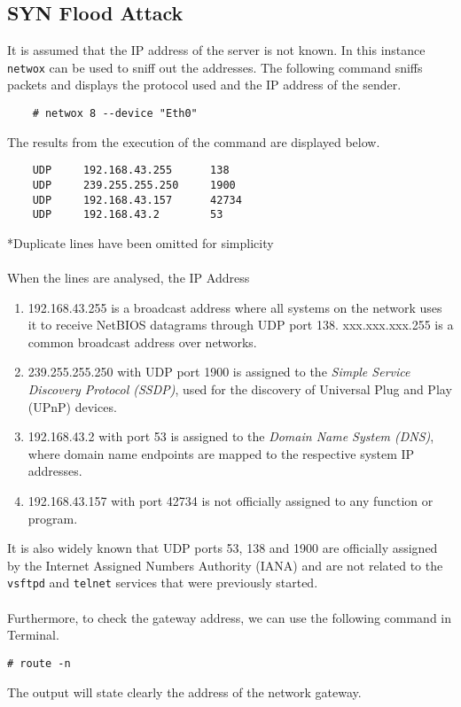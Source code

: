 \documentclass[a4paper,12pt]{article}
\begin{document}
	\subsection{SYN Flood Attack}
	It is assumed that the IP address of the server is not known. In this instance \texttt{netwox} can be used to sniff out the addresses. The following command sniffs packets and displays the protocol used and the IP address of the sender.
	\begin{verbatim}
	# netwox 8 --device "Eth0"
	\end{verbatim}
	\vspace{1em}The results from the execution of the command are displayed below.
	\begin{verbatim}
	UDP	    192.168.43.255      138
	UDP	    239.255.255.250     1900
	UDP	    192.168.43.157      42734
	UDP	    192.168.43.2        53
	\end{verbatim}
	*Duplicate lines have been omitted for simplicity\\\\When the lines are analysed, the IP Address\begin{enumerate}
		\item 192.168.43.255 is a broadcast address where all  systems on the network uses it to receive NetBIOS datagrams through UDP port 138. xxx.xxx.xxx.255 is a common broadcast address over networks.
		\item 239.255.255.250 with UDP port 1900 is assigned to the \textit{Simple Service Discovery Protocol (SSDP)}, used for the discovery of Universal Plug and Play (UPnP) devices.
		\item 192.168.43.2 with port 53 is assigned to the \textit{Domain Name System (DNS)}, where domain name endpoints are mapped to the respective system IP addresses.
		\item 192.168.43.157 with port 42734 is not officially assigned to any function or program.
	\end{enumerate}
It is also widely known that UDP ports 53, 138 and 1900 are officially assigned by the Internet Assigned Numbers Authority (IANA) and are not related to the \texttt{vsftpd} and \texttt{telnet} services that were previously started. \\\\Furthermore, to check the gateway address, we can use the following command in Terminal.
\begin{verbatim}
# route -n
\end{verbatim}
\vspace{1em} The output will state clearly the address of the network gateway.
\end{document}
